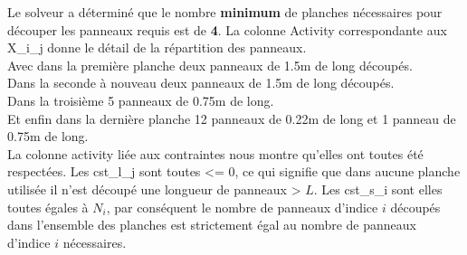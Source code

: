 \documentclass[12pt, openany]{report}
\begin{document}
Le solveur a déterminé que le nombre \textbf{minimum} de planches nécessaires pour découper les panneaux requis est de \textbf{4}. La colonne Activity correspondante aux X\_i\_j donne le détail de la répartition des panneaux. \\
Avec dans la première planche deux panneaux de 1.5m de long découpés. \\
Dans la seconde à nouveau deux panneaux de 1.5m de long découpés. \\
Dans la troisième 5 panneaux de 0.75m de long. \\
Et enfin dans la dernière planche 12 panneaux de 0.22m de long et 1 panneau de 0.75m de long. \\
La colonne activity liée aux contraintes nous montre qu'elles ont toutes été respectées. Les cst\_l\_j sont toutes <= 0, ce qui signifie que dans aucune planche utilisée il n'est découpé une longueur de panneaux > $L$. 
Les cst\_s\_i sont elles toutes égales à $N_{i}$, par conséquent le nombre de panneaux d'indice $i$ découpés dans l'ensemble des planches est strictement égal au nombre de panneaux d'indice $i$ nécessaires.
\end{document}
